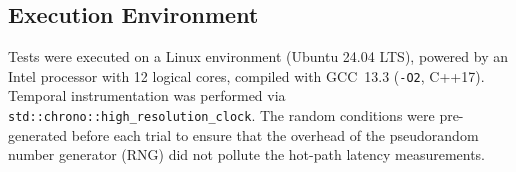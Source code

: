\subsection{Execution Environment}
Tests were executed on a Linux environment (Ubuntu 24.04 LTS), powered by an Intel processor with 12 logical cores, compiled with GCC~13.3 (\texttt{-O2}, C++17). Temporal instrumentation was performed via \texttt{std::chrono::high\_resolution\_clock}. The random conditions were pre-generated before each trial to ensure that the overhead of the pseudorandom number generator (RNG) did not pollute the hot-path latency measurements.
